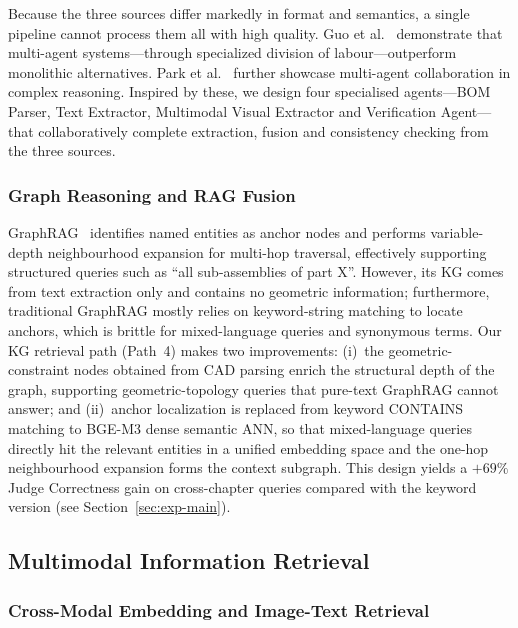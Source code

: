 \documentclass[applsci,article,submit,pdftex,moreauthors]{Definitions/mdpi}
\begin{document}
Because the three sources differ markedly in format and semantics, a single pipeline cannot process them all with high quality. Guo et al.~\citep{guo2024multiagent} demonstrate that multi-agent systems---through specialized division of labour---outperform monolithic alternatives. Park et al.~\citep{park2023generative} further showcase multi-agent collaboration in complex reasoning. Inspired by these, we design four specialised agents---BOM Parser, Text Extractor, Multimodal Visual Extractor and Verification Agent---that collaboratively complete extraction, fusion and consistency checking from the three sources.

\subsubsection{Graph Reasoning and RAG Fusion}

GraphRAG~\citep{edge2024graphrag} identifies named entities as anchor nodes and performs variable-depth neighbourhood expansion for multi-hop traversal, effectively supporting structured queries such as ``all sub-assemblies of part X''. However, its KG comes from text extraction only and contains no geometric information; furthermore, traditional GraphRAG mostly relies on keyword-string matching to locate anchors, which is brittle for mixed-language queries and synonymous terms. Our KG retrieval path (Path~4) makes two improvements: (i)~the geometric-constraint nodes obtained from CAD parsing enrich the structural depth of the graph, supporting geometric-topology queries that pure-text GraphRAG cannot answer; and (ii)~anchor localization is replaced from keyword CONTAINS matching to BGE-M3 dense semantic ANN, so that mixed-language queries directly hit the relevant entities in a unified embedding space and the one-hop neighbourhood expansion forms the context subgraph. This design yields a $+69\%$ Judge Correctness gain on cross-chapter queries compared with the keyword version (see Section~\ref{sec:exp-main}).

\subsection{Multimodal Information Retrieval}
\label{sec:related-mm}

\subsubsection{Cross-Modal Embedding and Image-Text Retrieval}
\end{document}

